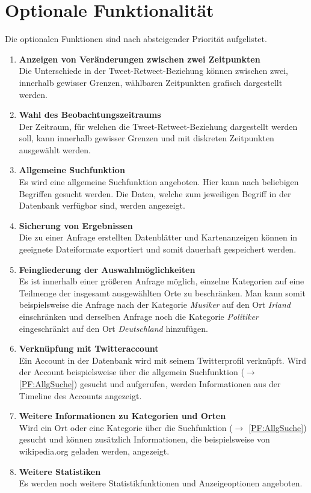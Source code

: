 \section{Optionale Funktionalität}
Die optionalen Funktionen sind nach absteigender Priorität aufgelistet.
\begin{enumerate}[ align=left, label={\textbf{\textbackslash F50\arabic*0\textbackslash}}]
	\item \textbf{Anzeigen von Veränderungen  zwischen zwei Zeitpunkten} \label{PF:Diff} \\
	Die Unterschiede in der Tweet-Retweet-Beziehung können zwischen zwei, innerhalb gewisser Grenzen, wählbaren Zeitpunkten grafisch dargestellt werden.
	\item \textbf{Wahl des Beobachtungszeitraums} \label{PF:WahlZeitraum} \\
	Der Zeitraum, für welchen die Tweet-Retweet-Beziehung dargestellt werden soll, kann innerhalb gewisser Grenzen und mit diskreten Zeitpunkten ausgewählt werden.
	\item \textbf{Allgemeine Suchfunktion} \label{PF:AllgSuche} \\
	Es wird eine allgemeine Suchfunktion angeboten. Hier kann nach beliebigen Begriffen gesucht werden. Die  Daten, welche zum jeweiligen Begriff in der Datenbank verfügbar sind, werden angezeigt.
	\item  \textbf{Sicherung von Ergebnissen} \label{PF:Sicherung} \\
	Die zu einer Anfrage erstellten Datenblätter und Kartenanzeigen können in geeignete Dateiformate exportiert und somit dauerhaft gespeichert werden.
	\item \textbf{Feingliederung der Auswahlmöglichkeiten} \\
	Es ist innerhalb einer größeren Anfrage möglich, einzelne Kategorien auf eine Teilmenge der insgesamt ausgewählten Orte zu beschränken. Man kann somit beispielsweise die Anfrage nach der Kategorie \emph{Musiker} auf den Ort \emph{Irland} einschränken und  derselben Anfrage noch die Kategorie \emph{Politiker} eingeschränkt auf den Ort \emph{Deutschland} hinzufügen.
	\item \textbf{Verknüpfung mit Twitteraccount} \label{PF:Verknuepfung} \\
	Ein Account in der Datenbank wird mit seinem Twitterprofil verknüpft. Wird der Account beispielsweise über die allgemein Suchfunktion ($\rightarrow$ \ref{PF:AllgSuche}) gesucht und aufgerufen, werden Informationen aus der Timeline des Accounts angezeigt. 
	\item \textbf{Weitere Informationen zu Kategorien und Orten} \label{PF:WeiterInfos} \\
	Wird ein Ort oder eine Kategorie über die Suchfunktion ($\rightarrow$ \ref{PF:AllgSuche}) gesucht und können zusätzlich Informationen, die beispielsweise von wikipedia.org geladen werden, angezeigt.
	
	\item \textbf{Weitere Statistiken} \label{PF:Statistiken} \\
	Es werden noch weitere Statistikfunktionen und Anzeigeoptionen angeboten.
\end{enumerate}
